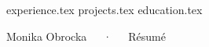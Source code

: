 \documentclass{awesome-cv}
\newcommand*{\sectiondir}{resume/}
\begin{document}
\makecvheader

{experience.tex}
{projects.tex}
{education.tex}

\makecvfooter
  {}
  {Monika Obrocka~~~·~~~Résumé}
  {}
\end{document}
